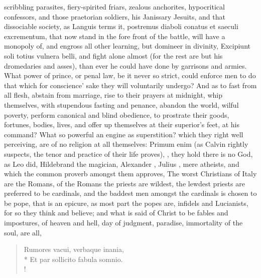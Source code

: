 {scribbling parasites, fiery-spirited friars, zealous anchorites,
hypocritical confessors, and those praetorian soldiers, his Janissary
Jesuits, and that dissociable society, as Languis terms it,
postremus diaboli conatus et saeculi excrementum, that now stand in the
fore front of the battle, will have a monopoly of, and engross all
other learning, but domineer in divinity, Excipiunt soli totius
vulnera belli, and fight alone almost (for the rest are but his
dromedaries and asses), than ever he could have done by garrisons and
armies. What power of prince, or penal law, be it never so strict,
could enforce men to do that which for conscience' sake they will
voluntarily undergo? And as to fast from all flesh, abstain from
marriage, rise to their prayers at midnight, whip themselves, with
stupendous fasting and penance, abandon the world, wilful poverty,
perform canonical and blind obedience, to prostrate their goods,
fortunes, bodies, lives, and offer up themselves at their superior's
feet, at his command? What so powerful an engine as superstition? which
they right well perceiving, are of no religion at all themselves:
Primum enim (as Calvin rightly suspects, the tenor and practice of
their life proves), , they hold there is no God, as Leo  did,
Hildebrand the magician, Alexander , Julius , mere atheists, and
which the common proverb amongst them approves, The worst
Christians of Italy are the Romans, of the Romans the priests are
wildest, the lewdest priests are preferred to be cardinals, and the
baddest men amongst the cardinals is chosen to be pope, that is an
epicure, as most part the popes are, infidels and Lucianists, for so
they think and believe; and what is said of Christ to be fables and
impostures, of heaven and hell, day of judgment, paradise, immortality
of the soul, are all,

\begin{latin}
\begin{verse}%
Rumores vacui, verbaque inania,\\*
Et par sollicito fabula somnio.\\!
\end{verse}%
\end{latin}

}
